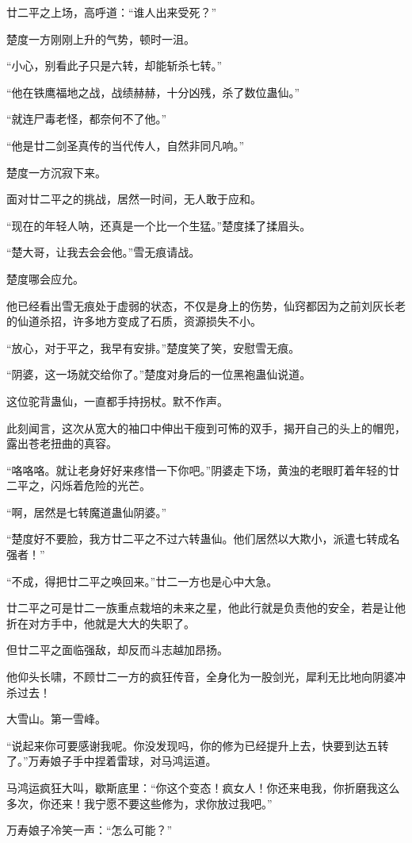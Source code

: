 \begin{this_body}
廿二平之上场，高呼道：“谁人出来受死？”

楚度一方刚刚上升的气势，顿时一沮。

“小心，别看此子只是六转，却能斩杀七转。”

“他在铁鹰福地之战，战绩赫赫，十分凶残，杀了数位蛊仙。”

“就连尸毒老怪，都奈何不了他。”

“他是廿二剑圣真传的当代传人，自然非同凡响。”

楚度一方沉寂下来。

面对廿二平之的挑战，居然一时间，无人敢于应和。

“现在的年轻人呐，还真是一个比一个生猛。”楚度揉了揉眉头。

“楚大哥，让我去会会他。”雪无痕请战。

楚度哪会应允。

他已经看出雪无痕处于虚弱的状态，不仅是身上的伤势，仙窍都因为之前刘灰长老的仙道杀招，许多地方变成了石质，资源损失不小。

“放心，对于平之，我早有安排。”楚度笑了笑，安慰雪无痕。

“阴婆，这一场就交给你了。”楚度对身后的一位黑袍蛊仙说道。

这位驼背蛊仙，一直都手持拐杖。默不作声。

此刻闻言，这次从宽大的袖口中伸出干瘦到可怖的双手，揭开自己的头上的帽兜，露出苍老扭曲的真容。

“咯咯咯。就让老身好好来疼惜一下你吧。”阴婆走下场，黄浊的老眼盯着年轻的廿二平之，闪烁着危险的光芒。

“啊，居然是七转魔道蛊仙阴婆。”

“楚度好不要脸，我方廿二平之不过六转蛊仙。他们居然以大欺小，派遣七转成名强者！”

“不成，得把廿二平之唤回来。”廿二一方也是心中大急。

廿二平之可是廿二一族重点栽培的未来之星，他此行就是负责他的安全，若是让他折在对方手中，他就是大大的失职了。

但廿二平之面临强敌，却反而斗志越加昂扬。

他仰头长啸，不顾廿二一方的疯狂传音，全身化为一股剑光，犀利无比地向阴婆冲杀过去！

大雪山。第一雪峰。

“说起来你可要感谢我呢。你没发现吗，你的修为已经提升上去，快要到达五转了。”万寿娘子手中捏着雷球，对马鸿运道。

马鸿运疯狂大叫，歇斯底里：“你这个变态！疯女人！你还来电我，你折磨我这么多次，你还来！我宁愿不要这些修为，求你放过我吧。”

万寿娘子冷笑一声：“怎么可能？”


\end{this_body}
